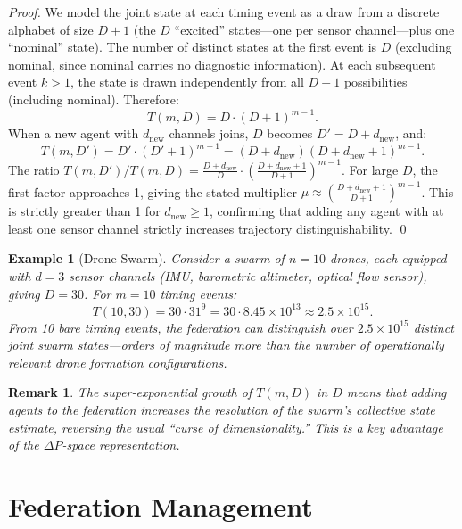 \documentclass[twocolumn,10pt]{article}
\newtheorem{remark}{Remark}[section]
\newtheorem{example}{Example}[section]
\newcommand{\DeltaP}{\Delta P}
\begin{document}
\begin{proof}
We model the joint state at each timing event as a draw from a discrete
alphabet of size $D + 1$ (the $D$ ``excited'' states---one per sensor
channel---plus one ``nominal'' state). The number of distinct states at the
first event is $D$ (excluding nominal, since nominal carries no diagnostic
information). At each subsequent event $k > 1$, the state is drawn
independently from all $D+1$ possibilities (including nominal). Therefore:
\[
  T(m, D) = D \cdot (D+1)^{m-1}.
\]
When a new agent with $d_{\mathrm{new}}$ channels joins, $D$ becomes
$D' = D + d_{\mathrm{new}}$, and:
\[
  T(m, D') = D' \cdot (D'+1)^{m-1}
  = (D + d_{\mathrm{new}})(D + d_{\mathrm{new}} + 1)^{m-1}.
\]
The ratio $T(m,D')/T(m,D) = \frac{D+d_{\mathrm{new}}}{D} \cdot
\left(\frac{D+d_{\mathrm{new}}+1}{D+1}\right)^{m-1}$. For large $D$, the
first factor approaches 1, giving the stated multiplier
$\mu \approx \left(\frac{D+d_{\mathrm{new}}+1}{D+1}\right)^{m-1}$.
This is strictly greater than 1 for $d_{\mathrm{new}} \geq 1$, confirming
that adding any agent with at least one sensor channel strictly increases
trajectory distinguishability. \qed
\end{proof}

\begin{example}[Drone Swarm]
\label{ex:drone}
Consider a swarm of $n = 10$ drones, each equipped with $d = 3$ sensor
channels (IMU, barometric altimeter, optical flow sensor), giving $D = 30$.
For $m = 10$ timing events:
\[
  T(10, 30) = 30 \cdot 31^9 = 30 \cdot 8.45 \times 10^{13}
  \approx 2.5 \times 10^{15}.
\]
From 10 bare timing events, the federation can distinguish over $2.5 \times
10^{15}$ distinct joint swarm states---orders of magnitude more than the number
of operationally relevant drone formation configurations.
\end{example}

\begin{remark}
The super-exponential growth of $T(m,D)$ in $D$ means that adding agents to
the federation \emph{increases} the resolution of the swarm's collective state
estimate, reversing the usual ``curse of dimensionality.'' This is a key
advantage of the $\DeltaP$-space representation.
\end{remark}

\section{Federation Management}
\label{sec:federation}
\end{document}
